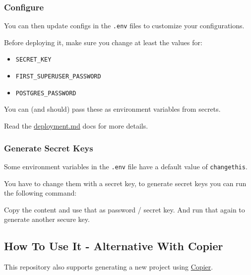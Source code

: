 \hypertarget{configure}{%
\subsubsection{Configure}\label{configure}}

You can then update configs in the \texttt{.env} files to customize your
configurations.

Before deploying it, make sure you change at least the values for:

\begin{itemize}
\tightlist
\item
  \texttt{SECRET\_KEY}
\item
  \texttt{FIRST\_SUPERUSER\_PASSWORD}
\item
  \texttt{POSTGRES\_PASSWORD}
\end{itemize}

You can (and should) pass these as environment variables from secrets.

Read the \href{./deployment.md}{deployment.md} docs for more details.

\hypertarget{generate-secret-keys}{%
\subsubsection{Generate Secret Keys}\label{generate-secret-keys}}

Some environment variables in the \texttt{.env} file have a default
value of \texttt{changethis}.

You have to change them with a secret key, to generate secret keys you
can run the following command:

\begin{Shaded}
\begin{Highlighting}[]
  
\end{Highlighting}
\end{Shaded}

Copy the content and use that as password / secret key. And run that
again to generate another secure key.

\hypertarget{how-to-use-it---alternative-with-copier}{%
\subsection{How To Use It - Alternative With
Copier}\label{how-to-use-it---alternative-with-copier}}

This repository also supports generating a new project using
\href{https://copier.readthedocs.io}{Copier}.

